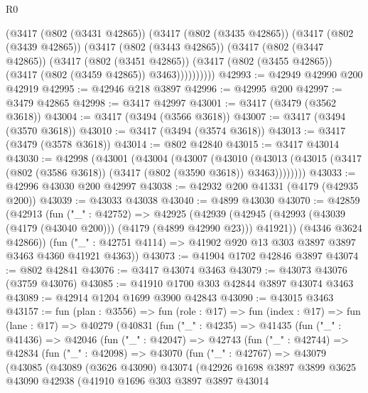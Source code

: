 \begin{lexlean}{R0}
\begin{coremodule}
        (@3417
          (@802 (@3431 @42865))
          (@3417
            (@802 (@3435 @42865))
            (@3417
              (@802 (@3439 @42865))
              (@3417
                (@802 (@3443 @42865))
                (@3417
                  (@802 (@3447 @42865))
                  (@3417
                    (@802 (@3451 @42865))
                    (@3417 (@802 (@3455 @42865)) (@3417 (@802 (@3459 @42865)) @3463))))))))))
@42993 := @42949 @42990 @200 @42919
@42995 := @42946 @218 @3897
@42996 := @42995 @200
@42997 := @3479 @42865
@42998 := @3417 @42997
@43001 := @3417 (@3479 (@3562 @3618))
@43004 := @3417 (@3494 (@3566 @3618))
@43007 := @3417 (@3494 (@3570 @3618))
@43010 := @3417 (@3494 (@3574 @3618))
@43013 := @3417 (@3479 (@3578 @3618))
@43014 := @802 @42840
@43015 := @3417 @43014
@43030 := @42998
    (@43001
      (@43004
        (@43007
          (@43010
            (@43013 (@43015 (@3417 (@802 (@3586 @3618)) (@3417 (@802 (@3590 @3618)) @3463))))))))
@43033 := @42996 @43030 @200 @42997
@43038 := @42932 @200 @41331 (@4179 (@42935 @200))
@43039 := @43033 @43038
@43040 := @4899 @43030
@43070 := @42859
    (@42913
      (fun ("_" : @42752) =>
      @42925
        (@42939 (@42945 (@42993 (@43039 (@4179 (@43040 @200))) (@4179 (@4899 @42990 @23))) @41921))
        (@4346 @3624 @42866))
      (fun ("_" : @42751 @4114) => @41902 @920 @13 @303 @3897 @3897 @3463 @4360 @41921 @4363))
@43073 := @41904 @1702 @42846 @3897
@43074 := @802 @42841
@43076 := @3417 @43074 @3463
@43079 := @43073 @43076 (@3759 @43076)
@43085 := @41910 @1700 @303 @42844 @3897 @43074 @3463
@43089 := @42914 @1204 @1699 @3900 @42843
@43090 := @43015 @3463
@43157 := fun (plan : @3556) =>
  fun (role : @17) =>
  fun (index : @17) =>
  fun (lane : @17) =>
  @40279
    (@40831
      (fun ("_" : @4235) =>
      @41435
        (fun ("_" : @41436) =>
        @42046
          (fun ("_" : @42047) =>
          @42743
            (fun ("_" : @42744) =>
            @42834
              (fun ("_" : @42098) =>
              @43070
                (fun ("_" : @42767) =>
                @43079
                  (@43085
                    (@43089
                      (@3626 @43090)
                      @43074
                      (@42926
                        @1698
                        @3897
                        @3899
                        @3625
                        @43090
                        @42938
                        (@41910
                          @1696
                          @303
                          @3897
                          @3897
                          @43014

\end{coremodule}
\end{lexlean}
